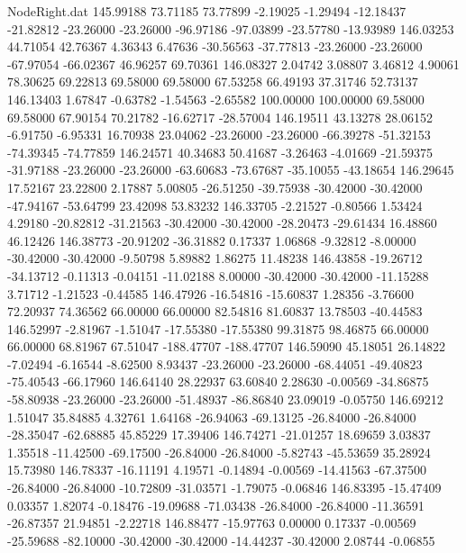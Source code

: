 \begin{filecontents}{NodeRight.dat}
 145.99188   73.71185   73.77899    -2.19025   -1.29494  -12.18437  -21.82812  -23.26000  -23.26000  -96.97186  -97.03899  -23.57780  -13.93989
 146.03253   44.71054   42.76367     4.36343    6.47636  -30.56563  -37.77813  -23.26000  -23.26000  -67.97054  -66.02367   46.96257   69.70361
 146.08327    2.04742    3.08807     3.46812    4.90061   78.30625   69.22813   69.58000   69.58000   67.53258   66.49193   37.31746   52.73137
 146.13403    1.67847   -0.63782    -1.54563   -2.65582  100.00000  100.00000   69.58000   69.58000   67.90154   70.21782  -16.62717  -28.57004
 146.19511   43.13278   28.06152    -6.91750   -6.95331   16.70938   23.04062  -23.26000  -23.26000  -66.39278  -51.32153  -74.39345  -74.77859
 146.24571   40.34683   50.41687    -3.26463   -4.01669  -21.59375  -31.97188  -23.26000  -23.26000  -63.60683  -73.67687  -35.10055  -43.18654
 146.29645   17.52167   23.22800     2.17887    5.00805  -26.51250  -39.75938  -30.42000  -30.42000  -47.94167  -53.64799   23.42098   53.83232
 146.33705   -2.21527   -0.80566     1.53424    4.29180  -20.82812  -31.21563  -30.42000  -30.42000  -28.20473  -29.61434   16.48860   46.12426
 146.38773  -20.91202  -36.31882     0.17337    1.06868   -9.32812   -8.00000  -30.42000  -30.42000   -9.50798    5.89882    1.86275   11.48238
 146.43858  -19.26712  -34.13712    -0.11313   -0.04151  -11.02188    8.00000  -30.42000  -30.42000  -11.15288    3.71712   -1.21523   -0.44585
 146.47926  -16.54816  -15.60837     1.28356   -3.76600   72.20937   74.36562   66.00000   66.00000   82.54816   81.60837   13.78503  -40.44583
 146.52997   -2.81967   -1.51047   -17.55380  -17.55380   99.31875   98.46875   66.00000   66.00000   68.81967   67.51047 -188.47707 -188.47707
 146.59090   45.18051   26.14822    -7.02494   -6.16544   -8.62500    8.93437  -23.26000  -23.26000  -68.44051  -49.40823  -75.40543  -66.17960
 146.64140   28.22937   63.60840     2.28630   -0.00569  -34.86875  -58.80938  -23.26000  -23.26000  -51.48937  -86.86840   23.09019   -0.05750
 146.69212    1.51047   35.84885     4.32761    1.64168  -26.94063  -69.13125  -26.84000  -26.84000  -28.35047  -62.68885   45.85229   17.39406
 146.74271  -21.01257   18.69659     3.03837    1.35518  -11.42500  -69.17500  -26.84000  -26.84000   -5.82743  -45.53659   35.28924   15.73980
 146.78337  -16.11191    4.19571    -0.14894   -0.00569  -14.41563  -67.37500  -26.84000  -26.84000  -10.72809  -31.03571   -1.79075   -0.06846
 146.83395  -15.47409    0.03357     1.82074   -0.18476  -19.09688  -71.03438  -26.84000  -26.84000  -11.36591  -26.87357   21.94851   -2.22718
 146.88477  -15.97763    0.00000     0.17337   -0.00569  -25.59688  -82.10000  -30.42000  -30.42000  -14.44237  -30.42000    2.08744   -0.06855

\end{filecontents}
